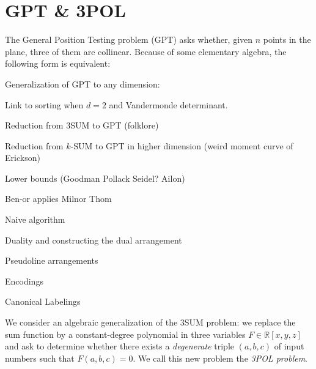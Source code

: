 \section{GPT \& 3POL}\label{sec:problem:pol}


The General Position Testing problem (GPT) asks whether, given \(n\) points in
the plane, three of them are collinear. Because of some elementary algebra, the
following form is equivalent:



Generalization of GPT to any dimension:



Link to sorting when \(d=2\) and Vandermonde determinant.

Reduction from 3SUM to GPT (folklore)

Reduction from \(k\)-SUM to GPT in higher dimension (weird moment curve of Erickson)

Lower bounds (Goodman Pollack Seidel? Ailon)

Ben-or applies Milnor Thom

Naive algorithm

Duality and constructing the dual arrangement

Pseudoline arrangements

Encodings

Canonical Labelings


We consider an algebraic generalization of the 3SUM problem: we replace the sum
function by a constant-degree polynomial in three variables $F \in
\mathbb{R}[x,y,z]$ and ask to determine whether there exists a
\emph{degenerate} triple $(a,b,c)$ of input numbers such that $F(a,b,c)=0$. We
call this new problem the \emph{3POL problem}.



